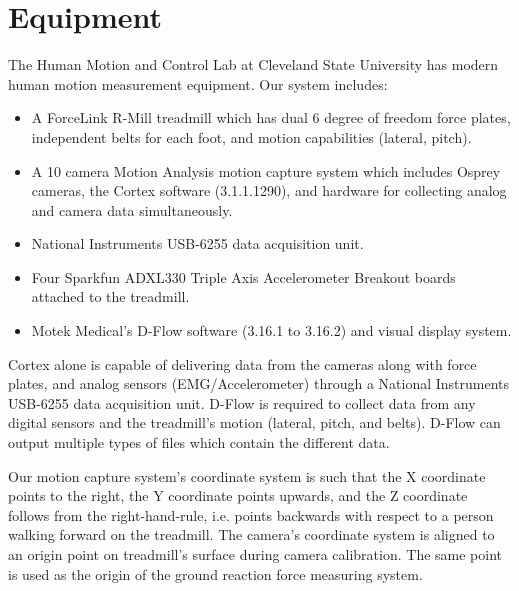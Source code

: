 \documentclass[10pt,a4paper,twocolumn]{article}
\begin{document}
\section*{Equipment}
%
The Human Motion and Control Lab at Cleveland State University has modern human
motion measurement equipment. Our system includes:

\begin{itemize}
  \item A ForceLink R-Mill treadmill which has dual 6 degree of freedom force
    plates, independent belts for each foot, and motion capabilities (lateral,
    pitch).
  \item A 10 camera Motion Analysis motion capture system which includes Osprey
    cameras, the Cortex software (3.1.1.1290), and hardware for collecting
    analog and camera data simultaneously.
  \item National Instruments USB-6255 data acquisition unit.
  \item Four Sparkfun ADXL330 Triple Axis Accelerometer Breakout boards
    attached to the treadmill.
  \item Motek Medical’s D-Flow software (3.16.1 to 3.16.2) and visual display
    system.
\end{itemize}

Cortex alone is capable of delivering data from the cameras along with force
plates, and analog sensors (EMG/Accelerometer) through a National Instruments
USB-6255 data acquisition unit. D-Flow is required to collect data from any
digital sensors and the treadmill's motion (lateral, pitch, and belts). D-Flow
can output multiple types of files which contain the different data.

Our motion capture system's coordinate system is such that the X coordinate
points to the right, the Y coordinate points upwards, and the Z coordinate
follows from the right-hand-rule, i.e. points backwards with respect to a
person walking forward on the treadmill. The camera's coordinate system is
aligned to an origin point on treadmill's surface during camera calibration.
The same point is used as the origin of the ground reaction force measuring
system.
\end{document}
